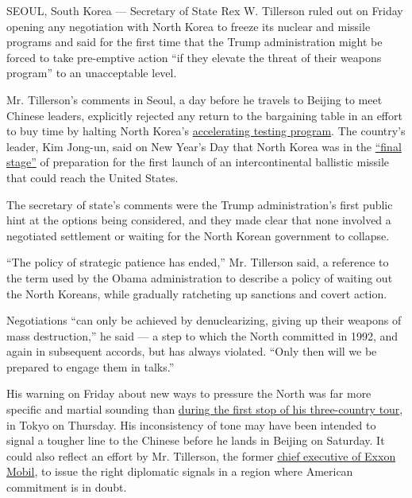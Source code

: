 SEOUL, South Korea --- Secretary of State Rex W. Tillerson ruled out on
Friday opening any negotiation with North Korea to freeze its nuclear
and missile programs and said for the first time that the Trump
administration might be forced to take pre-emptive action ``if they
elevate the threat of their weapons program'' to an unacceptable level.

Mr. Tillerson's comments in Seoul, a day before he travels to Beijing to
meet Chinese leaders, explicitly rejected any return to the bargaining
table in an effort to buy time by halting North Korea's
\href{https://www.nytimes.com/2017/02/17/world/asia/north-korea-nuclear-threat.html}{accelerating
testing program}. The country's leader, Kim Jong-un, said on New Year's
Day that North Korea was in the
\href{https://www.nytimes.com/2017/01/01/world/asia/north-korea-intercontinental-ballistic-missile-test-kim-jong-un.html}{``final
stage''} of preparation for the first launch of an intercontinental
ballistic missile that could reach the United States.

The secretary of state's comments were the Trump administration's first
public hint at the options being considered, and they made clear that
none involved a negotiated settlement or waiting for the North Korean
government to collapse.

``The policy of strategic patience has ended,'' Mr. Tillerson said, a
reference to the term used by the Obama administration to describe a
policy of waiting out the North Koreans, while gradually ratcheting up
sanctions and covert action.

Negotiations ``can only be achieved by denuclearizing, giving up their
weapons of mass destruction,'' he said --- a step to which the North
committed in 1992, and again in subsequent accords, but has always
violated. ``Only then will we be prepared to engage them in talks.''

His warning on Friday about new ways to pressure the North was far more
specific and martial sounding than
\href{https://www.nytimes.com/2017/03/16/world/asia/rex-tillerson-asia-trump-us-japan.html}{during
the first stop of his three-country tour}, in Tokyo on Thursday. His
inconsistency of tone may have been intended to signal a tougher line to
the Chinese before he lands in Beijing on Saturday. It could also
reflect an effort by Mr. Tillerson, the former
\href{https://www.nytimes.com/interactive/2017/01/11/us/politics/rex-tillerson-exxon-maverick-oil-diplomacy.html}{chief
executive of Exxon Mobil}, to issue the right diplomatic signals in a
region where American commitment is in doubt.

